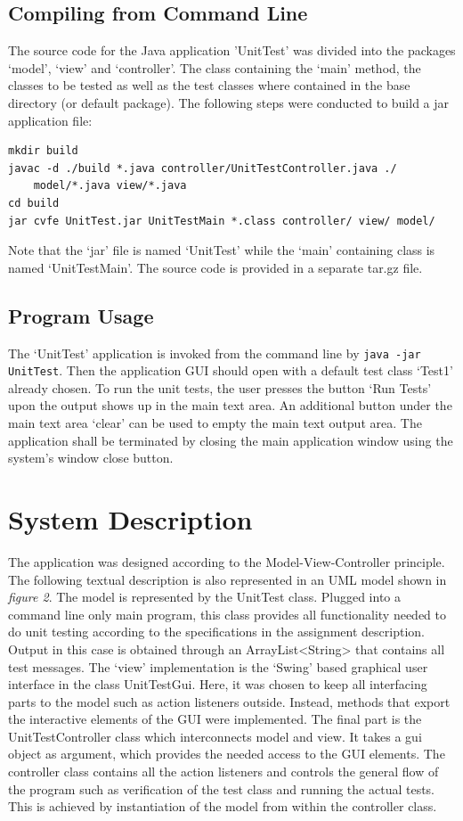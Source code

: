 \documentclass[a4paper,11pt,twoside]{article}
\begin{document}
\subsection{Compiling from Command Line}
The source code for the Java application 'UnitTest' was divided into the packages `model', `view' and `controller'. The class containing the `main' method, the classes to be tested as well as the test classes where contained in the base directory (or default package). The following steps were conducted to build a jar application file:
\begin{verbatim}
mkdir build
javac -d ./build *.java controller/UnitTestController.java ./
    model/*.java view/*.java
cd build
jar cvfe UnitTest.jar UnitTestMain *.class controller/ view/ model/
\end{verbatim} 
Note that the `jar' file is named `UnitTest' while the `main' containing class is named `UnitTestMain'.
The source code is provided in a separate tar.gz file.

\subsection{Program Usage}
The `UnitTest' application is invoked from the command line by \verb+java -jar UnitTest+. Then the application GUI should open with a default test class `Test1' already chosen. To run the unit tests, the user presses the button `Run Tests' upon the output shows up in the main text area. An additional button under the main text area `clear' can be used to empty the main text output area. The application shall be terminated by closing the main application window using the system's window close button.

\section{System Description}
The application was designed according to the Model-View-Controller principle. The following textual description is also represented in an UML model shown in \textit{figure 2}. The model is represented by the UnitTest class. Plugged into a command line only main program, this class provides all functionality needed to do unit testing according to the specifications in the assignment description. Output in this case is obtained through an ArrayList<String> that contains all test messages.
The `view' implementation is the `Swing' based graphical user interface in the class UnitTestGui. Here, it was chosen to keep all interfacing parts to the model such as action listeners outside. Instead, methods that export the interactive elements of the GUI were implemented.
The final part is the UnitTestController class which interconnects model and view. It takes a gui object as argument, which provides the needed access to the GUI elements. The controller class contains all the action listeners and controls the general flow of the program such as verification of the test class and running the actual tests. This is achieved by instantiation of the model from within the controller class.
\end{document}
